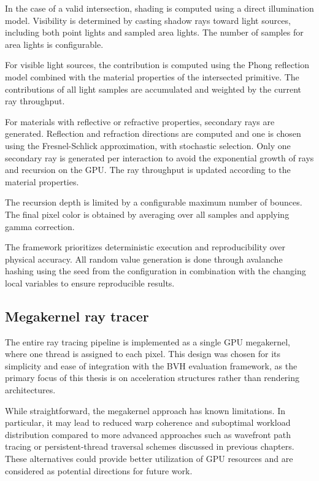 In the case of a valid intersection, shading is computed using a direct illumination model. Visibility is determined by casting shadow rays toward light sources, including both point lights and sampled area lights. The number of samples for area lights is configurable.

For visible light sources, the contribution is computed using the Phong reflection model \cite{P75} combined with the material properties of the intersected primitive. The contributions of all light samples are accumulated and weighted by the current ray throughput.

For materials with reflective or refractive properties, secondary rays are generated. Reflection and refraction directions are computed and one is chosen using the Fresnel-Schlick \cite{FS94} approximation, with stochastic selection. Only one secondary ray is generated per interaction to avoid the exponential growth of rays and recursion on the GPU. The ray throughput is updated according to the material properties.

The recursion depth is limited by a configurable maximum number of bounces. The final pixel color is obtained by averaging over all samples and applying gamma correction.

The framework prioritizes deterministic execution and reproducibility over physical accuracy. All random value generation is done through avalanche hashing using the seed from the configuration in combination with the changing local variables to ensure reproducible results.

\subsection{Megakernel ray tracer}

The entire ray tracing pipeline is implemented as a single GPU megakernel, where one thread is assigned to each pixel. This design was chosen for its simplicity and ease of integration with the BVH evaluation framework, as the primary focus of this thesis is on acceleration structures rather than rendering architectures.

While straightforward, the megakernel approach has known limitations. In particular, it may lead to reduced warp coherence and suboptimal workload distribution compared to more advanced approaches such as wavefront path tracing or persistent-thread traversal schemes discussed in previous chapters. These alternatives could provide better utilization of GPU resources and are considered as potential directions for future work.

